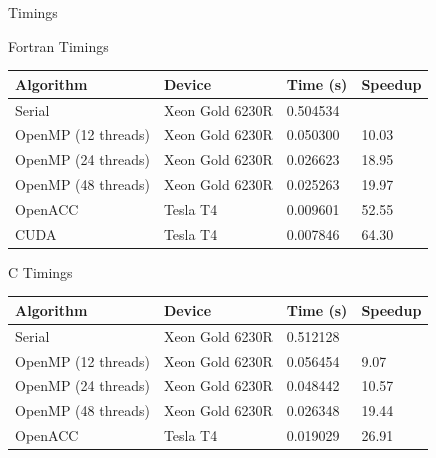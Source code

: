 \documentclass[10pt,t]{beamer}
\begin{document}
\begin{frame}[allowframebreaks]{Timings}
  \begin{exampleblock}{Fortran Timings}
    {\scriptsize
    \begin{center}
      \begin{tabular}{|bbbb|}
        \hline
        \rowcolor{lublue}Algorithm & Device & Time (s) & Speedup \\
        \hline
         Serial & Xeon Gold 6230R & 0.504534 & \\
         \hline
         OpenMP (12 threads) & Xeon Gold 6230R & 0.050300 & 10.03 \\
         OpenMP (24 threads) & Xeon Gold 6230R & 0.026623 & 18.95 \\
         OpenMP (48 threads) & Xeon Gold 6230R & 0.025263 & 19.97 \\
         \hline
         OpenACC & Tesla T4 & 0.009601 & 52.55 \\
         \hline
         CUDA & Tesla T4 & 0.007846 & 64.30 \\
        \hline
      \end{tabular}
    \end{center}
    }
  \end{exampleblock}
  \begin{exampleblock}{C Timings}
    {\scriptsize
    \begin{center}
      \begin{tabular}{|bbbb|}
        \hline
        \rowcolor{lublue}Algorithm & Device & Time (s) & Speedup \\
        \hline
         Serial & Xeon Gold 6230R & 0.512128 & \\
         \hline
         OpenMP (12 threads) & Xeon Gold 6230R & 0.056454 &  9.07 \\
         OpenMP (24 threads) & Xeon Gold 6230R & 0.048442 & 10.57 \\
         OpenMP (48 threads) & Xeon Gold 6230R & 0.026348 & 19.44 \\
         \hline
         OpenACC & Tesla T4 & 0.019029 & 26.91 \\
         \hline
      \end{tabular}
    \end{center}
    }
  \end{exampleblock}
 \end{frame}
\end{document}
